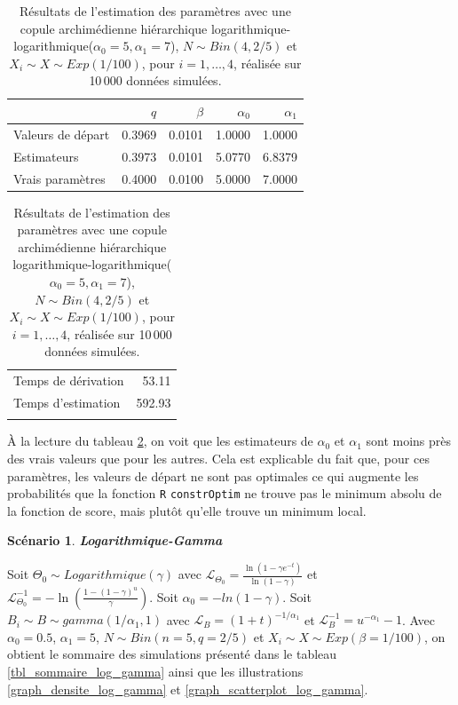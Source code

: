 \documentclass{article}
\newtheorem{Scenario}{Scénario}
\begin{document}
		\begin{table}[H]
			\centering
			\begin{tabular}{lrrrr}
				\hline
				& $q$ & $\beta$ & $\alpha_0$ & $\alpha_1$ \\ 
				\hline
				Valeurs de départ & 0.3969 & 0.0101 & 1.0000 & 1.0000 \\ 
				Estimateurs & 0.3973 & 0.0101 & 5.0770 & 6.8379 \\ 
				Vrais paramètres & 0.4000 & 0.0100 & 5.0000 & 7.0000 \\ 
				\hline
			\end{tabular}
			\begin{tabular}{lr}
				\hline
				&  \\ 
				\hline
				Temps de dérivation & 53.11 \\ 
				Temps d'estimation & 592.93 \\ 
				\\
				\hline
			\end{tabular}
		\caption[Résultats du scénario \ref{scenario_log_log}]{Résultats de l'estimation des paramètres avec une copule archimédienne hiérarchique logarithmique-logarithmique($\alpha_0=5, \alpha_1=7$), $N \sim Bin(4, 2/5)$ et $X_i \sim X \sim Exp(1/100)$, pour $i=1,\dots, 4$, réalisée sur 10\,000 données simulées.}
		\label{tbl_resultats_log_log}
		\end{table}
	
		À la lecture du tableau \ref{tbl_resultats_log_log}, on voit que les estimateurs de $\alpha_0$ et $\alpha_1$ sont moins près des vrais valeurs que pour les autres. Cela est explicable du fait que, pour ces paramètres, les valeurs de départ ne sont pas optimales ce qui augmente les probabilités que la fonction \texttt{R} \texttt{constrOptim} ne trouve pas le minimum absolu de la fonction de score, mais plutôt qu'elle trouve un minimum local.
		
		\begin{Scenario}\label{scenario_log_gamma}
			\textbf{Logarithmique-Gamma}
		\end{Scenario}
	
		Soit $\Theta_0 \sim Logarithmique(\gamma)$ avec $\mathscr{L}_{\Theta_0} = \frac{\ln(1-\gamma e^{-t})}{\ln(1-\gamma)}$ et $\mathscr{L}^{-1}_{\Theta_0} = -\ln \left( \frac{1-(1-\gamma)^u}{\gamma} \right)$. Soit $\alpha_{0} = -ln(1-\gamma)$.
		Soit $B_i \sim B \sim gamma(1/\alpha_1,1)$ avec $\mathscr{L}_{B} = (1+t)^{-1/\alpha_1}$ et $\mathscr{L}^{-1}_{B} = u^{-\alpha_1} - 1$. Avec $\alpha_0 = 0.5$, $\alpha_1 = 5$, $N\sim Bin(n=5, q=2/5)$ et $X_i \sim X \sim Exp(\beta = 1/100)$, on obtient le sommaire des simulations présenté dans le tableau \ref{tbl_sommaire_log_gamma} ainsi que les illustrations \ref{graph_densite_log_gamma} et \ref{graph_scatterplot_log_gamma}.
		
\end{document}
